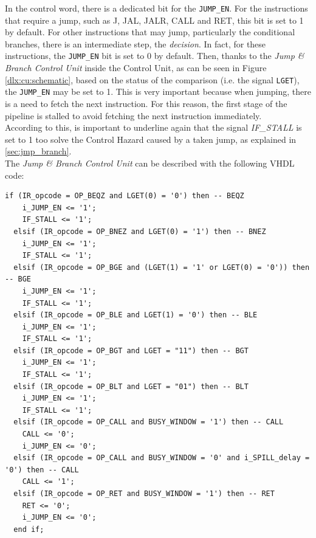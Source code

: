 In the control word, there is a dedicated bit for the \texttt{JUMP\_EN}. For the instructions that require a jump, such as J, JAL, JALR, CALL and RET, this bit is set to 1 by default. For other instructions that may jump, particularly the conditional branches, there is an intermediate step, the \emph{decision}. In fact, for these instructions, the \texttt{JUMP\_EN} bit is set to 0 by default. Then, thanks to the \emph{Jump \& Branch Control Unit} inside the Control Unit, as can be seen in Figure \ref{dlx:cu:schematic}, based on the status of the comparison (i.e. the signal \texttt{LGET}), the \texttt{JUMP\_EN} may be set to 1. This is very important because when jumping, there is a need to fetch the next instruction. For this reason, the first stage of the pipeline is stalled to avoid fetching the next instruction immediately.\\ 

According to this, is important to underline again that the signal \emph{IF\_STALL} is set to 1 too solve the Control Hazard caused by a taken jump, as explained in \autoref{sec:jmp_branch}.\\

The \emph{Jump \& Branch Control Unit} can be described with the following VHDL code:\\

\begin{lstlisting}[style=vhdl,caption={VHDL code for the conditional branch},label=conditional_branches_code]
  if (IR_opcode = OP_BEQZ and LGET(0) = '0') then -- BEQZ 
    i_JUMP_EN <= '1';
    IF_STALL <= '1';
  elsif (IR_opcode = OP_BNEZ and LGET(0) = '1') then -- BNEZ
    i_JUMP_EN <= '1';
    IF_STALL <= '1';
  elsif (IR_opcode = OP_BGE and (LGET(1) = '1' or LGET(0) = '0')) then -- BGE
    i_JUMP_EN <= '1';
    IF_STALL <= '1';
  elsif (IR_opcode = OP_BLE and LGET(1) = '0') then -- BLE
    i_JUMP_EN <= '1';
    IF_STALL <= '1';
  elsif (IR_opcode = OP_BGT and LGET = "11") then -- BGT
    i_JUMP_EN <= '1';
    IF_STALL <= '1';
  elsif (IR_opcode = OP_BLT and LGET = "01") then -- BLT
    i_JUMP_EN <= '1';
    IF_STALL <= '1';
  elsif (IR_opcode = OP_CALL and BUSY_WINDOW = '1') then -- CALL
    CALL <= '0';
    i_JUMP_EN <= '0';	
  elsif (IR_opcode = OP_CALL and BUSY_WINDOW = '0' and i_SPILL_delay = '0') then -- CALL
    CALL <= '1';
  elsif (IR_opcode = OP_RET and BUSY_WINDOW = '1') then -- RET
    RET <= '0';
    i_JUMP_EN <= '0';
  end if;
\end{lstlisting}

